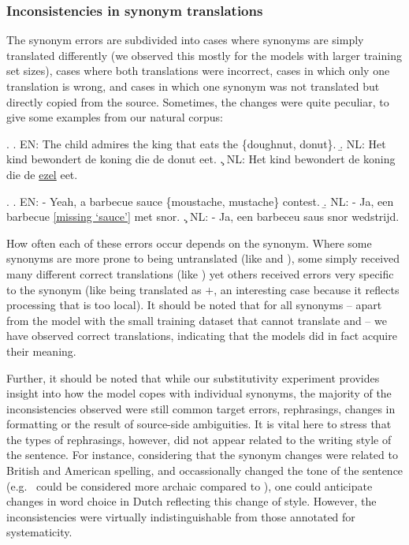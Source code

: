 \subsubsection{Inconsistencies in synonym translations}

The synonym errors are subdivided into cases where synonyms are simply translated differently (we observed this mostly for the models with larger training set sizes), cases where both translations were incorrect, cases in which only one translation is wrong, and cases in which one synonym was not translated but directly copied from the source.
Sometimes, the changes were quite peculiar, to give some examples from our natural corpus:

\ex.
\a. \textsc{EN}: The child admires the king that eats the \{doughnut, donut\}.
\b. \textsc{NL}: Het kind bewondert de koning die de donut eet.
\c. \textsc{NL}: Het kind bewondert de koning die de \underline{ezel} eet.

\ex.
\a. \textsc{EN}: - Yeah, a barbecue sauce \{moustache, mustache\} contest.
\b. \textsc{NL}: - Ja, een barbecue \underline{[missing `sauce']} met snor.
\c. \textsc{NL}: - Ja, een barbeceu saus snor wedstrijd.

How often each of these errors occur depends on the synonym.
Where some synonyms are more prone to being untranslated (like  and ), some simply received many different correct translations (like ) yet others received errors very specific to the synonym (like  being translated as $+$, an interesting case because it reflects processing that is too local).
It should be noted that for all synonyms -- apart from the model with the small training dataset that cannot translate  and  -- we have observed correct translations, indicating that the models did in fact acquire their meaning.

Further, it should be noted that while our substitutivity experiment provides insight into how the model copes with individual synonyms, the majority of the inconsistencies observed were still common target errors, rephrasings, changes in formatting or the result of source-side ambiguities. 
It is vital here to stress that the types of rephrasings, however, did not appear related to the writing style of the sentence. For instance, considering that the synonym changes were related to British and American spelling, and occassionally changed the tone of the sentence (e.g.\  could be considered more archaic compared to ), one could anticipate changes in word choice in Dutch reflecting this change of style. However, the inconsistencies were virtually indistinguishable from those annotated for systematicity.